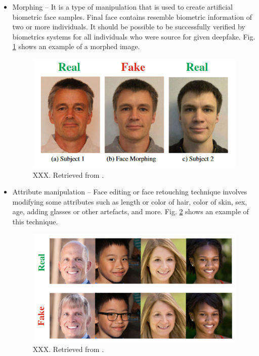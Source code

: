 \begin{itemize}
\item Morphing – It is a type of manipulation that is used to create artificial biometric face samples. Final face contains resemble biometric information of two or more individuals. It should be possible to be successfully verified by biometrics systems for all individuals who were source for given deepfake. Fig. \ref{fig:morphing} shows an example of a morphed image.
\begin{figure}[H]
    \centering
    \includegraphics[width=.5\linewidth]{other-fig/morphing.png}        
    \caption{XXX. Retrieved from \cite{IntroductionToDigitalFaceManipulation}.}
\label{fig:morphing}
\end{figure}

\item Attribute manipulation – Face editing or face retouching technique involves modifying some attributes such as length or color of hair, color of skin, sex, age, adding glasses or other artefacts, and more. Fig. \ref{fig:attribute_manipulation} shows an example of this technique.
\begin{figure}[H]
    \centering
    \includegraphics[width=.6\linewidth]{other-fig/attribute_manipulation.png}        
    \caption{XXX. Retrieved from \cite{IntroductionToDigitalFaceManipulation}.}
\label{fig:attribute_manipulation}
\end{figure}


\end{itemize}
